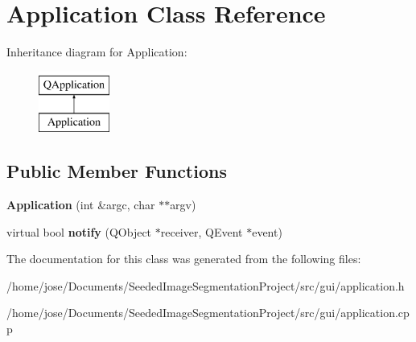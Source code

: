\hypertarget{classApplication}{\section{Application Class Reference}
\label{classApplication}
}
Inheritance diagram for Application\-:\begin{figure}[H]
\begin{center}
\leavevmode
\includegraphics[height=2.000000cm]{classApplication}
\end{center}
\end{figure}
\subsection*{Public Member Functions}
\begin{DoxyCompactItemize}
\item 
\hypertarget{classApplication_a6e443cbe3481a06d8effb4fa8878499c}{{\bfseries Application} (int \&argc, char $\ast$$\ast$argv)}\label{classApplication_a6e443cbe3481a06d8effb4fa8878499c}

\item 
\hypertarget{classApplication_a566d9d9262f143093ce79c6e528fb584}{virtual bool {\bfseries notify} (Q\-Object $\ast$receiver, Q\-Event $\ast$event)}\label{classApplication_a566d9d9262f143093ce79c6e528fb584}

\end{DoxyCompactItemize}


The documentation for this class was generated from the following files\-:\begin{DoxyCompactItemize}
\item 
/home/jose/\-Documents/\-Seeded\-Image\-Segmentation\-Project/src/gui/application.\-h\item 
/home/jose/\-Documents/\-Seeded\-Image\-Segmentation\-Project/src/gui/application.\-cpp\end{DoxyCompactItemize}
